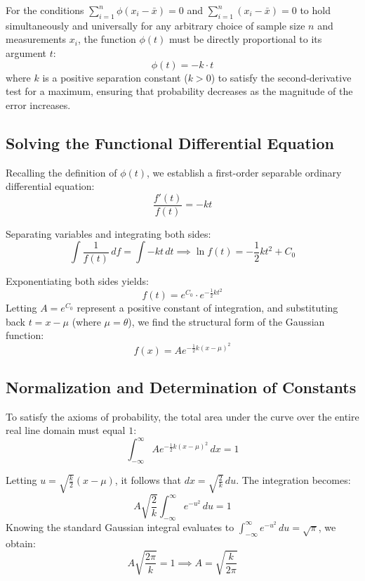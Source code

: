 \documentclass[11pt,a4paper]{article}
\begin{document}
For the conditions $\sum_{i=1}^{n} \phi(x_i - \bar{x}) = 0$ and $\sum_{i=1}^{n} (x_i - \bar{x}) = 0$ to hold simultaneously and universally for any arbitrary choice of sample size $n$ and measurements $x_i$, the function $\phi(t)$ must be directly proportional to its argument $t$:
\begin{equation}
\phi(t) = -k \cdot t
\end{equation}
where $k$ is a positive separation constant ($k > 0$) to satisfy the second-derivative test for a maximum, ensuring that probability decreases as the magnitude of the error increases.

\subsection{Solving the Functional Differential Equation}
Recalling the definition of $\phi(t)$, we establish a first-order separable ordinary differential equation:
\begin{equation}
\frac{f'(t)}{f(t)} = -kt
\end{equation}

Separating variables and integrating both sides:
\begin{equation}
\int \frac{1}{f(t)} \, df = \int -k t \, dt \implies \ln f(t) = -\frac{1}{2}kt^2 + C_0
\end{equation}

Exponentiating both sides yields:
\begin{equation}
f(t) = e^{C_0} \cdot e^{-\frac{1}{2}kt^2}
\end{equation}
Letting $A = e^{C_0}$ represent a positive constant of integration, and substituting back $t = x - \mu$ (where $\mu = \theta$), we find the structural form of the Gaussian function:
\begin{equation}
f(x) = A e^{-\frac{1}{2}k(x - \mu)^2}
\end{equation}

\subsection{Normalization and Determination of Constants}
To satisfy the axioms of probability, the total area under the curve over the entire real line domain must equal $1$:
\begin{equation}
\int_{-\infty}^{\infty} A e^{-\frac{1}{2}k(x - \mu)^2} \, dx = 1
\end{equation}

Letting $u = \sqrt{\frac{k}{2}}(x - \mu)$, it follows that $dx = \sqrt{\frac{2}{k}} \, du$. The integration becomes:
\begin{equation}
A \sqrt{\frac{2}{k}} \int_{-\infty}^{\infty} e^{-u^2} \, du = 1
\end{equation}
Knowing the standard Gaussian integral evaluates to $\int_{-\infty}^{\infty} e^{-u^2} \, du = \sqrt{\pi}$, we obtain:
\begin{equation}
A \sqrt{\frac{2\pi}{k}} = 1 \implies A = \sqrt{\frac{k}{2\pi}}
\end{equation}
\end{document}
